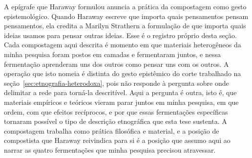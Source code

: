 A epígrafe que Haraway formulou \parencite[p.~35]{Haraway2023Ficar} anuncia a prática da compostagem como gesto epistemológico. Quando Haraway escreve que importa quais pensamentos pensam pensamentos, ela credita a Marilyn Strathern a formulação de que importa quais ideias usamos para pensar outras ideias. Esse é o registro próprio desta seção. Cada compostagem aqui descrita é momento em que materiais heterogêneos da minha pesquisa foram postos em camadas e fermentaram juntos, e nessa fermentação aprenderam uns dos outros como pensar uns com os outros. A operação que isto nomeia é distinta do gesto epistêmico do corte trabalhado na seção~\ref{sec:etnografia-heterodoxa}, pois não responde à pergunta sobre onde delimitar a rede para torná-la descritível. Aqui a pergunta é outra, isto é, que materiais empíricos e teóricos vieram parar juntos em minha pesquisa, em que ordem, com que efeitos recíprocos, e por que essas fermentações específicas tornaram possível o tipo de descrição etnográfica que esta tese sustenta. A compostagem trabalha como prática filosófica e material, e a posição de compostista que Haraway reivindica para si \parencite[p.~101]{Haraway2016Staying} é a posição que assumo aqui ao narrar as quatro fermentações que minha pesquisa precisou atravessar.

